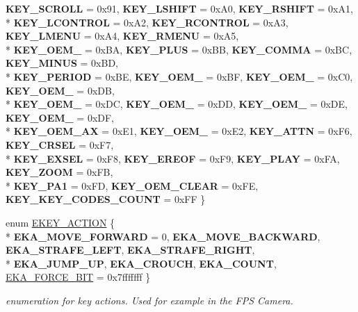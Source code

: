 \begin{DoxyCompactItemize}
{\bfseries K\+E\+Y\+\_\+\+S\+C\+R\+O\+LL} = 0x91, 
{\bfseries K\+E\+Y\+\_\+\+L\+S\+H\+I\+FT} = 0x\+A0, 
{\bfseries K\+E\+Y\+\_\+\+R\+S\+H\+I\+FT} = 0x\+A1, 
\\*
{\bfseries K\+E\+Y\+\_\+\+L\+C\+O\+N\+T\+R\+OL} = 0x\+A2, 
{\bfseries K\+E\+Y\+\_\+\+R\+C\+O\+N\+T\+R\+OL} = 0x\+A3, 
{\bfseries K\+E\+Y\+\_\+\+L\+M\+E\+NU} = 0x\+A4, 
{\bfseries K\+E\+Y\+\_\+\+R\+M\+E\+NU} = 0x\+A5, 
\\*
{\bfseries K\+E\+Y\+\_\+\+O\+E\+M\+\_} = 0x\+BA, 
{\bfseries K\+E\+Y\+\_\+\+P\+L\+US} = 0x\+BB, 
{\bfseries K\+E\+Y\+\_\+\+C\+O\+M\+MA} = 0x\+BC, 
{\bfseries K\+E\+Y\+\_\+\+M\+I\+N\+US} = 0x\+BD, 
\\*
{\bfseries K\+E\+Y\+\_\+\+P\+E\+R\+I\+OD} = 0x\+BE, 
{\bfseries K\+E\+Y\+\_\+\+O\+E\+M\+\_} = 0x\+BF, 
{\bfseries K\+E\+Y\+\_\+\+O\+E\+M\+\_} = 0x\+C0, 
{\bfseries K\+E\+Y\+\_\+\+O\+E\+M\+\_} = 0x\+DB, 
\\*
{\bfseries K\+E\+Y\+\_\+\+O\+E\+M\+\_} = 0x\+DC, 
{\bfseries K\+E\+Y\+\_\+\+O\+E\+M\+\_} = 0x\+DD, 
{\bfseries K\+E\+Y\+\_\+\+O\+E\+M\+\_} = 0x\+DE, 
{\bfseries K\+E\+Y\+\_\+\+O\+E\+M\+\_} = 0x\+DF, 
\\*
{\bfseries K\+E\+Y\+\_\+\+O\+E\+M\+\_\+\+AX} = 0x\+E1, 
{\bfseries K\+E\+Y\+\_\+\+O\+E\+M\+\_} = 0x\+E2, 
{\bfseries K\+E\+Y\+\_\+\+A\+T\+TN} = 0x\+F6, 
{\bfseries K\+E\+Y\+\_\+\+C\+R\+S\+EL} = 0x\+F7, 
\\*
{\bfseries K\+E\+Y\+\_\+\+E\+X\+S\+EL} = 0x\+F8, 
{\bfseries K\+E\+Y\+\_\+\+E\+R\+E\+OF} = 0x\+F9, 
{\bfseries K\+E\+Y\+\_\+\+P\+L\+AY} = 0x\+FA, 
{\bfseries K\+E\+Y\+\_\+\+Z\+O\+OM} = 0x\+FB, 
\\*
{\bfseries K\+E\+Y\+\_\+\+P\+A1} = 0x\+FD, 
{\bfseries K\+E\+Y\+\_\+\+O\+E\+M\+\_\+\+C\+L\+E\+AR} = 0x\+FE, 
{\bfseries K\+E\+Y\+\_\+\+K\+E\+Y\+\_\+\+C\+O\+D\+E\+S\+\_\+\+C\+O\+U\+NT} = 0x\+FF
 \}\hypertarget{namespaceirr_a54da2a0e231901735e3da1b0edf72eb3}{}\label{namespaceirr_a54da2a0e231901735e3da1b0edf72eb3}

\item 
enum \hyperlink{namespaceirr_aa9946ac9f3142f9e790ce52d59fd6168}{E\+K\+E\+Y\+\_\+\+A\+C\+T\+I\+ON} \{ \\*
{\bfseries E\+K\+A\+\_\+\+M\+O\+V\+E\+\_\+\+F\+O\+R\+W\+A\+RD} = 0, 
{\bfseries E\+K\+A\+\_\+\+M\+O\+V\+E\+\_\+\+B\+A\+C\+K\+W\+A\+RD}, 
{\bfseries E\+K\+A\+\_\+\+S\+T\+R\+A\+F\+E\+\_\+\+L\+E\+FT}, 
{\bfseries E\+K\+A\+\_\+\+S\+T\+R\+A\+F\+E\+\_\+\+R\+I\+G\+HT}, 
\\*
{\bfseries E\+K\+A\+\_\+\+J\+U\+M\+P\+\_\+\+UP}, 
{\bfseries E\+K\+A\+\_\+\+C\+R\+O\+U\+CH}, 
{\bfseries E\+K\+A\+\_\+\+C\+O\+U\+NT}, 
\hyperlink{namespaceirr_aa9946ac9f3142f9e790ce52d59fd6168a27e7067f9bc0bc5143b0bac183ca6c6b}{E\+K\+A\+\_\+\+F\+O\+R\+C\+E\+\_\+B\+IT} = 0x7fffffff
 \}\begin{DoxyCompactList}\small\item\em enumeration for key actions. Used for example in the F\+PS Camera. \end{DoxyCompactList}
\end{DoxyCompactItemize}

